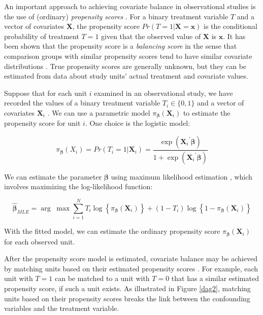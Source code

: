 An important approach to achieving covariate balance in observational studies is the use of (ordinary) {\it propensity scores} \cite{Rosenbaum1983}.  For a binary treatment variable $T$ and a vector of covariates $\pmb{X}$, the propensity score $Pr(T=1|\pmb{X}=\pmb{x})$ is the conditional probability of treatment $T=1$ given that the observed value of $\pmb{X}$ is $\pmb{x}$.  It has been shown that the propensity score is a {\it balancing score} in the sense that comparison groups with similar propensity scores tend to have similar covariate distributions \cite{Rosenbaum1983}.  True propensity scores are generally unknown, but they can be estimated from data about study units' actual treatment and covariate values.

Suppose that for each unit $i$ examined in an observational study, we have recorded the values of a binary treatment variable ${T_i} \in \{ 0,1\} $ and a vector of covariates ${\pmb{X}_i}$ .  We can use a parametric model ${\pi _{\pmb\beta} }({\pmb{X}_i})$ to estimate the propensity score for unit $i$.  One choice is the logistic model:

\begin{equation*}
{\pi _{\pmb\beta} }({X_i}) = Pr({T_i} = 1|{\pmb{X}_i}) = \frac{{\exp ({\pmb{X}_i}^\prime \pmb\beta )}}{{1 + \exp ({\pmb{X}_i}^\prime \pmb\beta )}}
\end{equation*}

We can estimate the parameter $\pmb\beta$ using maximum likelihood estimation \cite{Silvapulle1981}, which involves maximizing the log-likelihood function:

\begin{equation}\label{eq1}
{\pmb{\hat \beta} _{MLE}} = \arg \;\max \sum\limits_{i = 1}^N {{T_i}\log \left\{ {{\pi _{\pmb\beta} }({\pmb{X}_i})} \right\} + (1 - {T_i})} \log \left\{ {1 - {\pi _{\pmb\beta} }({\pmb{X}_i})} \right\}
\end{equation}

With the fitted model, we can estimate the ordinary propensity score  ${\pi _{\pmb\beta}}({\pmb{X}_i})$ for each observed unit.

After the propensity score model is estimated, covariate balance may be achieved by matching units based on their estimated propensity scores \cite{Rosenbaum1983}.  For example, each unit with $T=1$ can be matched to a unit with $T=0$ that has a similar estimated propensity score, if such a unit exists.  As illustrated in Figure \ref{dag2}, matching units based on their propensity scores breaks the link between the confounding variables and the treatment variable.

